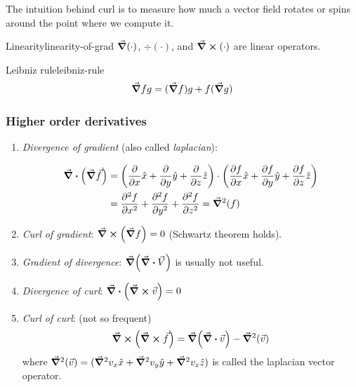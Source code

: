 \documentclass[12pt]{extarticle}
\begin{document}
The intuition behind curl is to measure how much a vector field rotates or spins around the point where we compute it.

\begin{proposition}{Linearity}{linearity-of-grad}
    $\grad(\mathord{\cdot})$, $\div(\mathord{\cdot})$, and $\curl(\mathord{\cdot})$ are linear operators.
\end{proposition}

\begin{proposition}{Leibniz rule}{leibniz-rule}
    \begin{equation}
        \grad{fg} = (\grad f)g + f (\grad g)
    \end{equation}
\end{proposition}

\subsubsection{Higher order derivatives}
\label{sec:higher-order-derivatives}

\begin{enumerate}
    \item \textit{Divergence of gradient}
          (also called \textit{laplacian}):

          \begin{align}
              \div (\grad \vec f) & = \left( \pdv{}{x} \hat{x} + \pdv{}{y} \hat{y} + \pdv{}{z} \hat{z} \right) \cdot \left( \pdv{f}{x} \hat{x} + \pdv{f}{y} \hat{y} + \pdv{f}{z} \hat{z} \right) \\
                                  & = \pdv[2]{f}{x} + \pdv[2]{f}{y} + \pdv[2]{f}{z} = \grad^2(f)
          \end{align}

    \item \textit{Curl of gradient}: $\curl(\grad f) = 0$ (Schwartz theorem holds).
    \item \textit{Gradient of divergence}: $\grad (\div \vec V)$ is usually not useful.
    \item \textit{Divergence of curl}: $\div (\curl \vec v) = 0$
    \item \textit{Curl of curl}: (not so frequent)
          \begin{equation}
              \curl (\curl \vec f) = \grad (\div \vec v) - \grad^2(\vec v)
          \end{equation}
          where $\grad^2(\vec v) = (\grad^2 v_x \hat x + \grad^2 v_y \hat y + \grad^2 v_z \hat z)$ is called the laplacian vector operator.
\end{enumerate}
\end{document}
